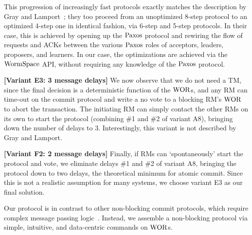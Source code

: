 This progression of increasingly fast protocols exactly matches the description by Gray and Lamport~\cite{gray:2006}; 
they too proceed from an unoptimized 8-step protocol to an optimized 4-step one in identical fashion, via 6-step and 5-step protocols. 
In their case, this is achieved by opening up the $\mathrm{Paxos}$ protocol and rewiring the flow of requests and ACKs between the various 
$\mathrm{Paxos}$ roles of acceptors, leaders, proposers, and learners. In our case, the optimizations are achieved via the $\mathrm{WormSpace}$ API, 
without requiring any knowledge of the $\mathrm{Paxos}$ protocol.

\textbf{[Variant E3: 3 message delays]} We now observe that we do not need a TM, 
since the final decision is a deterministic function of the $\mathrm{WOR}$s, 
and any RM can time-out on the commit protocol and write a no vote to a blocking RM's $\mathrm{WOR}$ to abort the transaction. 
The initiating RM can simply contact the other RMs on its own to start the protocol (combining \#1 and \#2 of variant A8), 
bringing down the number of delays to 3. Interestingly, this variant is not described by Gray and Lamport.


\textbf{[Variant F2: 2 message delays]} Finally, if RMs can `spontaneously' start the protocol and vote, 
we eliminate delays \#1 and \#2 of variant A8, bringing the protocol down to two delays, 
the theoretical minimum for atomic commit. Since this is not a realistic assumption for many systems, we choose variant E3 as our final solution.

Our protocol is in contrast to other non-blocking commit protocols, 
which require complex message passing logic~\cite{distsys}. Instead, we assemble a non-blocking protocol via simple, 
intuitive, and data-centric commands on $\mathrm{WOR}$s.



